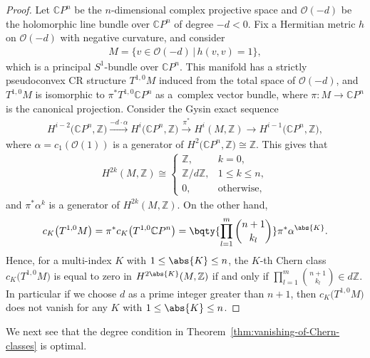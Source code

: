 \documentclass[10pt,a4paper]{amsart}
\numberwithin{equation}{section}
\begin{document}
\begin{proof}Let $\mathbb{C}P^{n}$ be the $n$-dimensional complex projective space and $\mathcal{O}(- d)$ be the holomorphic line bundle over $\mathbb{C}P^{n}$ of degree $- d < 0$. Fix a Hermitian metric $h$ on $\mathcal{O}(- d)$ with negative curvature, and consider
\begin{gather*}
M = \big\{v \in \mathcal{O}(- d) \,|\, h(v, v) = 1\big\},
\end{gather*}
which is a principal $S^{1}$-bundle over $\mathbb{C}P^{n}$. This manifold has a strictly pseudoconvex CR structure $T^{1, 0} M$ induced from the total space of $\mathcal{O}(- d)$, and $T^{1, 0} M$ is isomorphic to $\pi^{*} T^{1, 0} \mathbb{C}P^{n}$ as a~complex vector bundle, where $\pi \colon M \to \mathbb{C}P^{n}$ is the canonical projection. Consider the Gysin exact sequence
\begin{gather*}
H^{i - 2}\big(\mathbb{C}P^{n}, \mathbb{Z}\big) \xrightarrow{- d \cdot \alpha}H^{i}\big(\mathbb{C}P^{n}, \mathbb{Z}\big) \xrightarrow{\pi^{*}} H^{i}(M, \mathbb{Z}) \rightarrow H^{i - 1}\big(\mathbb{C}P^{n}, \mathbb{Z}\big),
\end{gather*}
where $\alpha = c_{1}(\mathcal{O}(1))$ is a generator of $H^{2}\big(\mathbb{C}P^{n}, \mathbb{Z}\big) \cong \mathbb{Z}$. This gives that
\begin{gather*}
H^{2 k}(M, \mathbb{Z})\cong\begin{cases}
\mathbb{Z}, & k = 0, \\
\mathbb{Z} / d \mathbb{Z}, & 1 \leq k \leq n, \\
0, & \text{otherwise},
\end{cases}
\end{gather*}
and $\pi^{*} \alpha^{k}$ is a generator of $H^{2 k}(M, \mathbb{Z})$. On the other hand,
\begin{gather*}
c_{K}\big(T^{1,0}M\big)= \pi^{*} c_{K}\big(T^{1, 0} \mathbb{C}P^{n}\big) = \bqty{\prod_{l = 1}^{m} \binom{n + 1}{k_{l}}} \pi^{*} \alpha^{\abs{K}}.
\end{gather*}
Hence, for a multi-index $K$ with $1 \leq \abs{K} \leq n$, the $K$-th Chern class $c_{K}\big(T^{1,0}M\big)$ is equal to zero in $H^{2 \abs{K}}(M, \mathbb{Z})$ if and only if $\prod\limits_{l = 1}^{m} \binom{n + 1}{k_{l}} \in d \mathbb{Z}$. In particular if we choose $d$ as a prime integer greater than $n + 1$, then $c_{K}\big(T^{1,0}M\big)$ does not vanish for any $K$ with $1 \leq \abs{K} \leq n$.
\end{proof}

We next see that the degree condition in Theorem~\ref{thm:vanishing-of-Chern-classes} is optimal.
\end{document}
